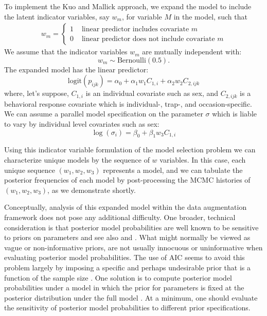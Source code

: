 To implement the Kuo and Mallick approach, we expand the model to
include the latent indicator variables, say $w_{m}$, for variable $M$
in the model, such that
\begin{eqnarray*}
w_{m} = \left\{
\begin{array}{cc} 1 &  \mbox{ linear predictor includes  covariate $m$} \\
                  0 & \mbox{ linear predictor does not
                                include covariate $m$}
 \end{array}
\right.
\end{eqnarray*}
We assume that the indicator variables $w_{m}$ are mutually
independent with:
\[
w_m \sim \mbox{Bernoulli}(0.5).
\]
The expanded model has the linear predictor:
\[
\mbox{logit}(p_{ijk}) = \alpha_{0} + \alpha_{1}w_{1} C_{1,i} + \alpha_{2}w_{2} C_{2,ijk}
\]
where, let's suppose, $C_{1,i}$ is an individual covariate such
as sex, and $C_{2,ijk}$ is a behavioral response covariate which is
individual-, trap-, and occasion-specific.  We can assume a parallel
model specification on the parameter $\sigma$ which is liable to vary
by individual level covariates such as sex:
\[
 \log(\sigma_{i}) = \beta_{0} + \beta_{1} w_{3} C_{1,i}
\]

Using this indicator variable formulation of the model selection
problem we can characterize unique models by the sequence of $w$
variables. In this case, each unique sequence $(w_{1},w_{2},w_{3})$
represents a model, and we can tabulate the posterior frequencies of
each model by post-processing the MCMC histories of
$(w_{1},w_{2},w_{3})$, as we demonstrate shortly.

Conceptually, analysis of this expanded model within the data
augmentation framework does not pose any additional difficulty. One
broader, technical consideration is that posterior model probabilities
are well known to be sensitive to priors on parameters
\citep{aitkin:1991, link_barker:2006} and see also
\citet[][Sec. 3.4.3]{royle_dorazio:2008} and
\citet[][Sec. 7.2.5]{link_barker:2010}.  What might normally be viewed
as vague or non-informative priors, are not usually innocuous or
uninformative when evaluating posterior model probabilities. The use
of AIC seems to avoid this problem largely by imposing a specific and
perhaps undesirable prior that is a function of the sample size
\citep{kadane_lazar:2004}. One solution is to compute posterior model
probabilities under a model in which the prior for parameters is fixed
at the posterior distribution under the full model
\citep{aitkin:1991}. At a minimum, one should evaluate the sensitivity
of posterior model probabilities to different prior specifications.


